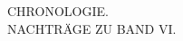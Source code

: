 \clearpage\begingroup\NoSourceHead{}
\begin{center}
\vspace*{2.5in}
{\Large CHRONOLOGIE.}\\[.45in]
{\large NACHTRÄGE ZU BAND VI.}
\end{center}
\clearpage\endgroup
